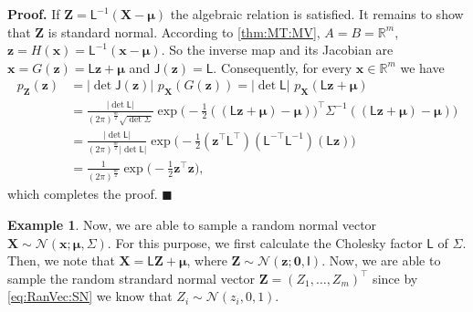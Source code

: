 \documentclass[10pt]{article}
\theoremstyle{definition}
\theoremstyle{definition}
\newtheorem{exmp}{Example}[section]
\theoremstyle{remark}
\newenvironment{prf}{\noindent\textbf{Proof.}}{\hfill$\blacksquare$}
\begin{document}
\begin{prf}
If $\mathbf{Z}=\mathsf{L}^{-1}(\mathbf{X}-\boldsymbol{\mu})$ the algebraic relation is satisfied. It remains to show that $\mathbf{Z}$ is standard normal. According to \cref{thm:MT:MV}, $A=B=\mathbb{R}^m$, $\mathbf{z}=H(\mathbf{x})=\mathsf{L}^{-1}(\mathbf{x}-\boldsymbol{\mu})$. So the inverse map and its Jacobian are  $\mathbf{x}=G(\mathbf{z})=\mathsf{L}\mathbf{z}+\boldsymbol{\mu}$ and $\mathsf{J}(\mathbf{z}) = \mathsf{L}$. Consequently, for every $\mathbf{x}\in\mathbb{R}^m$ we have
\begin{align*}
p_{\mathbf{Z}}(\mathbf{z}) &= |\det\mathsf{J}(\mathbf{z})| \,\, p_{\mathbf{X}}(G(\mathbf{z}))  = |\det\mathsf{L}|\,\, p_{\mathbf{X}}(\mathsf{L}\mathbf{z}+\boldsymbol{\mu}) \\
&= \frac{|\det\mathsf{L}|}{(2\pi)^{\frac{m}{2}} \sqrt{\det\mathsf{\Sigma}}} \exp \Big(-\frac{1}{2} ((\mathsf{L}\mathbf{z}+\boldsymbol{\mu})-\boldsymbol{\mu}))^{\top}\mathsf{\Sigma}^{-1}((\mathsf{L}\mathbf{z}+\boldsymbol{\mu})-\boldsymbol{\mu}) \Big)\\
&= \frac{|\det\mathsf{L}|}{(2\pi)^{\frac{m}{2}}|\det\mathsf{L}|} \exp \Big(-\frac{1}{2} (\mathbf{z}^{\top}\mathsf{L}^{\top})(\mathsf{L}^{-\top} \mathsf{L}^{-1})(\mathsf{L}\mathbf{z}) \Big)\\
&=\frac{1}{(2\pi)^{\frac{m}{2}}} \exp \Big(-\frac{1}{2} \mathbf{z}^{\top} \mathbf{z} \Big),
\end{align*}
which completes the proof.
\end{prf}
\begin{exmp}
Now, we are able to sample a random normal vector $\mathbf{X}\sim\mathcal{N}(\mathbf{x}; \boldsymbol{\mu}, \mathsf{\Sigma})$. For this purpose, we first calculate the Cholesky factor $\mathsf{L}$ of $\mathsf{\Sigma}$. Then, we note that $\mathbf{X} = \mathsf{L} \mathbf{Z} + \boldsymbol{\mu}$, where $\mathbf{Z}\sim\mathcal{N}(\mathbf{z}; \mathbf{0}, \mathsf{I})$. Now, we are able to sample the random strandard normal vector $\mathbf{Z}=(Z_1,\dots,Z_m)^{\top}$ since by \cref{eq:RanVec:SN} we know that $Z_i\sim\mathcal{N}(z_i, 0, 1)$.
\label{exmp:sample}
\end{exmp}
\end{document}
